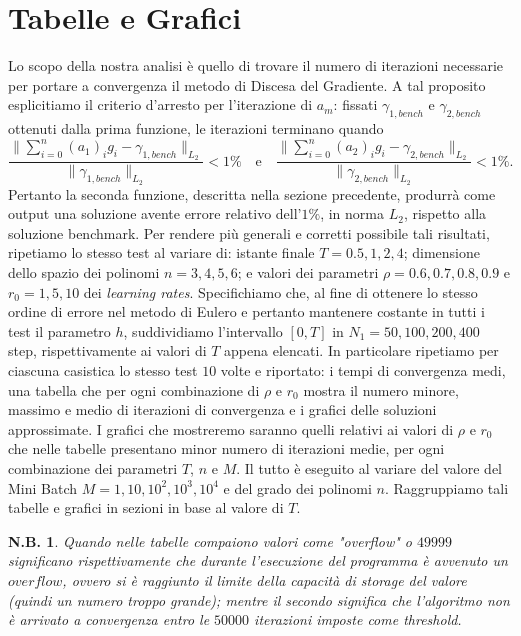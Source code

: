 \documentclass[a4paper,11pt,openright]{report}
\newtheorem{notabene}[teo]{N.B.}
\begin{document}
\section{Tabelle e Grafici}
Lo scopo della nostra analisi è quello di trovare il numero di iterazioni necessarie per portare a convergenza il metodo di Discesa del Gradiente. A tal proposito esplicitiamo il criterio d'arresto per l'iterazione di $a_m$: fissati $\gamma_{1,bench}$ e $\gamma_{2, bench}$ ottenuti dalla prima funzione, le iterazioni terminano quando
\[ 
\frac{\|\sum_{i=0}^n (a_1)_i g_i - \gamma_{1, bench} \|_{L_2}}{\| \gamma_{1, bench}\|_{L_2}} < 1\% \ \ \ \mbox{ e } \ \ \ \frac{\|\sum_{i=0}^n (a_2)_i g_i - \gamma_{2, bench} \|_{L_2}}{\| \gamma_{2, bench}\|_{L_2}} < 1\%.
\]
Pertanto la seconda funzione, descritta nella sezione precedente, produrrà come output una soluzione avente errore relativo dell'$1 \% $, in norma $L_2$, rispetto alla soluzione benchmark. Per rendere più generali e corretti possibile tali risultati, ripetiamo lo stesso test al variare di: istante finale $ T = 0.5, 1, 2, 4$; dimensione dello spazio dei polinomi $ n = 3, 4, 5, 6 $; e valori dei parametri $\rho = 0.6, 0.7, 0.8, 0.9$ e $r_0 = 1, 5, 10$ dei \emph{learning rates}. Specifichiamo che, al fine di ottenere lo stesso ordine di errore nel metodo di Eulero e pertanto mantenere costante in tutti i test il parametro $h$, suddividiamo l'intervallo $[0,T]$ in $N_1 = 50, 100, 200, 400$ step, rispettivamente ai valori di $T$ appena elencati. In particolare ripetiamo per ciascuna casistica lo stesso test $10$ volte e riportato: i tempi di convergenza medi, una tabella che per ogni combinazione di $\rho$ e $r_0$ mostra il numero minore, massimo e medio di iterazioni di convergenza e i grafici delle soluzioni approssimate. I grafici che mostreremo saranno quelli relativi ai valori di $\rho$ e $r_0$ che nelle tabelle presentano minor numero di iterazioni medie, per ogni combinazione dei parametri $T$, $n$ e $M$. Il tutto è eseguito al variare del valore del Mini Batch $M = 1, 10, 10^2, 10^3, 10^4$ e del grado dei polinomi $n$. Raggruppiamo tali tabelle e grafici in sezioni in base al valore di $T$.

\begin{notabene}
Quando nelle tabelle compaiono valori come "overflow" o $49999$ significano rispettivamente che durante l'esecuzione del programma è avvenuto un $overflow$, ovvero si è raggiunto il limite della capacità di storage del valore (quindi un numero troppo grande); mentre il secondo significa che l'algoritmo non è arrivato a convergenza entro le $50000$ iterazioni imposte come threshold.
\end{notabene}
\end{document}
